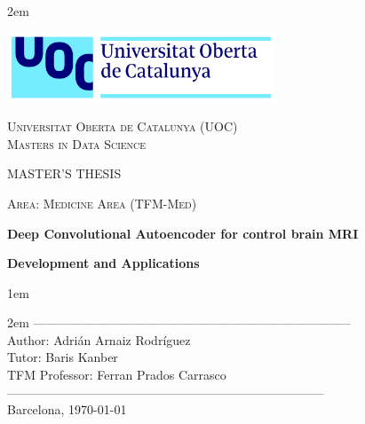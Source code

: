 \newpage
\thispagestyle{empty}

\baselineskip 2em


\centerline{\includegraphics[width=0.6\textwidth]{images/UOC-logo}}
\begin{center}
\textsc{Universitat Oberta de Catalunya (UOC) \\
 Masters in Data Science\\}


\vspace*{1.5cm}

\textsc{\Large MASTER'S THESIS}

\vspace*{0.5cm}

\textsc{\large Area: Medicine Area (TFM-Med)}



\vspace*{2.0cm}

\textbf{\Large Deep Convolutional Autoencoder for control brain MRI}

\textbf{\large Development and Applications}

\vspace{2.5cm}
\baselineskip 1em

\baselineskip 2em
-----------------------------------------------------------------------------\\
Author:     Adrián Arnaiz Rodríguez\\
Tutor:      Baris Kanber\\
TFM Professor: Ferran Prados Carrasco\\
-----------------------------------------------------------------------------\\
\vspace*{1.5cm}
Barcelona, \today

\end{center}

\newpage
\pagestyle{empty}
\hfill
